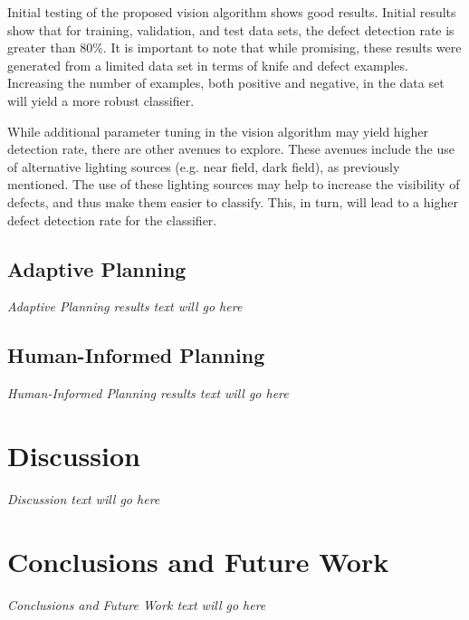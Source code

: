\documentclass[letterpaper, 10 pt, conference]{ieeeconf}  %
\begin{document}
Initial testing of the proposed vision algorithm shows good results. Initial results show that for training, validation, and test data sets, the defect detection rate is greater than 80\%. It is important to note that while promising, these results were generated from a limited data set in terms of knife and defect examples. Increasing the number of examples, both positive and negative, in the data set will yield a more robust classifier.

While additional parameter tuning in the vision algorithm may yield higher detection rate, there are other avenues to explore. These avenues include the use of alternative lighting sources (e.g. near field, dark field), as previously mentioned. The use of these lighting sources may help to increase the visibility of defects, and thus make them easier to classify. This, in turn, will lead to a higher defect detection rate for the classifier.

\subsection{Adaptive Planning}

\textit{Adaptive Planning results text will go here}

\subsection{Human-Informed Planning}

\textit{Human-Informed Planning results text will go here}

\section{Discussion}

\textit{Discussion text will go here}

\section{Conclusions and Future Work}

\textit{Conclusions and Future Work text will go here}



\end{document}
